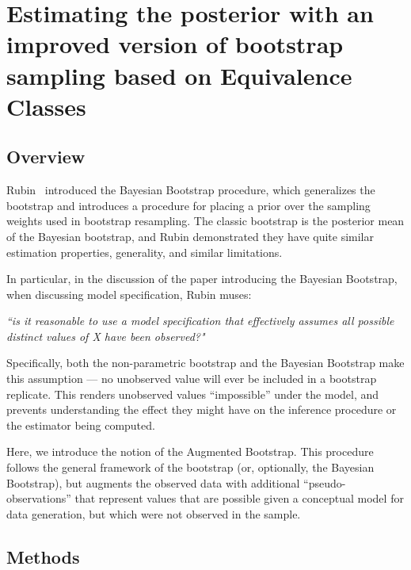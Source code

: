 
\renewcommand{\thechapter}{4}

\chapter[Improving the Posterior Estimates]{Estimating the posterior with an improved 
version of bootstrap sampling based on Equivalence Classes} 
\label{chapt4}

\section{Overview}
Rubin~\citep{rubin1981bayesian} introduced the Bayesian Bootstrap procedure, which generalizes 
the bootstrap and introduces a procedure for placing a prior over the sampling weights used in 
bootstrap resampling. The classic bootstrap is the posterior mean of the Bayesian bootstrap, and 
Rubin demonstrated they have quite similar estimation properties, generality, and similar 
limitations.

In particular, in the discussion of the paper introducing the Bayesian Bootstrap, when 
discussing model specification, Rubin muses:

\textit{``is it reasonable to use a model specification that effectively assumes all possible distinct 
values of X have been observed?"}

Specifically, both the non-parametric bootstrap and the Bayesian Bootstrap make this assumption — 
no unobserved value will ever be included in a bootstrap replicate. This renders unobserved 
values ``impossible'' under the model, and prevents understanding the effect they might have on 
the inference procedure or the estimator being computed.

Here, we introduce the notion of the Augmented Bootstrap. This procedure follows the general 
framework of the bootstrap (or, optionally, the Bayesian Bootstrap), but augments the observed 
data with additional ``pseudo-observations'' that represent values that are possible given a 
conceptual model for data generation, but which were not observed in the sample.

\section{Methods}

